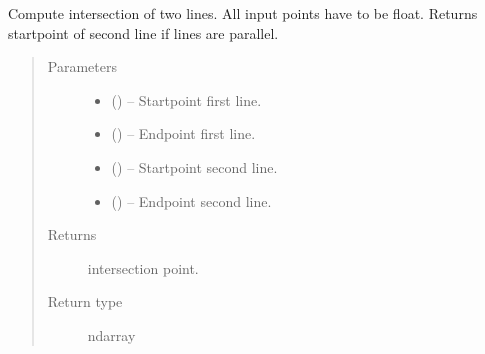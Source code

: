 \documentclass[letterpaper,10pt,english]{sphinxmanual}
\begin{document}
\begin{fulllineitems}
\label{\detokenize{image_helpers:image_helpers.line_intersect}}
Compute intersection of two lines.
All input points have to be float.
Returns startpoint of second line if lines are parallel.
\begin{quote}\begin{description}
\item[{Parameters}] \leavevmode\begin{itemize}
\item {} 
 () -- Startpoint first line.

\item {} 
 () -- Endpoint first line.

\item {} 
 () -- Startpoint second line.

\item {} 
 () -- Endpoint second line.

\end{itemize}

\item[{Returns}] \leavevmode
intersection point.

\item[{Return type}] \leavevmode
ndarray

\end{description}\end{quote}

\end{fulllineitems}


\begin{fulllineitems}
\label{\detokenize{image_helpers:image_helpers.pint}}
\end{fulllineitems}

\end{document}
